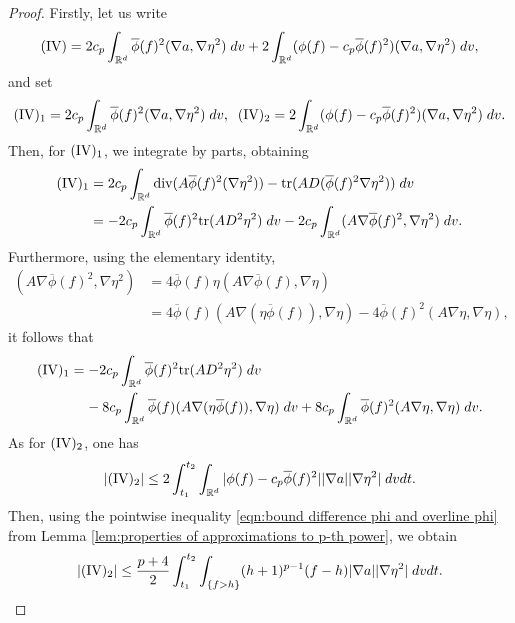 \documentclass[12pt,american]{amsart}
\numberwithin{equation}{section}
\theoremstyle{plain}
\theoremstyle{definition}                  %
\def\tr{\textnormal{tr}}
\def\dive{\textnormal{div}}
\begin{document}
  \begin{proof}
   Firstly, let us write
  \begin{align*}
    (\textnormal{IV}) = 2c_p\int_{\mathbb{R}^d}\overline{\phi}(f)^2(\nabla a,\nabla \eta^2)\;dv+2\int_{\mathbb{R}^d}(\phi(f)-c_p\overline{\phi}(f)^2)(\nabla a,\nabla \eta^2)\;dv,
  \end{align*}
  and set
  \begin{align*}
    (\textnormal{IV})_1 = 2c_p\int_{\mathbb{R}^d}\overline{\phi}(f)^2(\nabla a,\nabla \eta^2)\;dv,\;\;(\textnormal{IV})_2  = 2\int_{\mathbb{R}^d}(\phi(f)-c_p\overline{\phi}(f)^2)(\nabla a,\nabla \eta^2)\;dv.   
  \end{align*}
  Then, for $(\textnormal{IV})_1$, we integrate by parts, obtaining
  \begin{align*}
    (\textnormal{IV})_1 & = 2c_p\int_{\mathbb{R}^d}\dive(A \overline{\phi}(f)^2 (\nabla \eta^2 ) ) - \tr(AD(\overline{\phi}(f)^2\nabla \eta^2)) \;dv	\\
    & = -2c_p\int_{\mathbb{R}^d}\overline{\phi}(f)^2 \tr(AD^2\eta^2)\;dv-2c_p\int_{\mathbb{R}^d}(A\nabla \overline{\phi}(f)^2,\nabla \eta^2)\;dv.
  \end{align*}	
  Furthermore, using the elementary identity,
  \begin{align*}
    (A\nabla \overline{\phi}(f)^2,\nabla \eta^2 ) & = 4\overline{\phi}(f)\eta (A\nabla \overline{\phi}(f),\nabla \eta)\\
    & = 4\overline{\phi}(f) (A\nabla (\eta \overline{\phi}(f)),\nabla \eta)-4\overline{\phi}(f)^2  (A\nabla \eta,\nabla \eta),
  \end{align*}
  it follows that
  \begin{align*}
    (\textnormal{IV})_1 & = -2c_p\int_{\mathbb{R}^d}\overline{\phi}(f)^2 \tr(AD^2\eta^2)\;dv\\
    &\;\;\;\;-8c_p\int_{\mathbb{R}^d}\overline{\phi}(f) (A\nabla (\eta \overline{\phi}(f)),\nabla \eta)\;dv+8c_p\int_{\mathbb{R}^d}\overline{\phi}(f)^2  (A\nabla \eta,\nabla \eta)\;dv.
  \end{align*}  
  As for $(\textnormal{IV})_2$, one has
  \begin{align*}
    |(\textnormal{IV})_2|\leq 2\int_{t_1}^{t_2}\int_{\mathbb{R}^d}|\phi(f)-c_p\overline{\phi}(f)^2||\nabla a||\nabla \eta^2|\;dvdt.
  \end{align*}
  Then, using the pointwise inequality \eqref{eqn:bound difference phi and overline phi} from Lemma \ref{lem:properties of approximations to p-th power}, we obtain
  \begin{align*}
    |(\textnormal{IV})_2|\leq \frac{p+4}{2}\int_{t_1}^{t_2}\int_{\{f>h\}} (h+1)^{p-1}(f-h)|\nabla a||\nabla \eta^2|\;dvdt.
  \end{align*}
  \end{proof}
\end{document}
